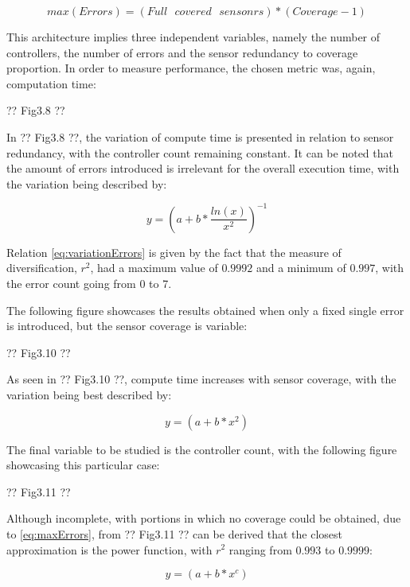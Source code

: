 \begin{equation}
    \label{eq:maxErrors}
    max(Errors) = (Full\text{ } covered \text{ } sensonrs) * (Coverage - 1) 
\end{equation}

This architecture implies three independent variables, namely the number of controllers, the number of errors and the sensor redundancy to
coverage proportion. In order to measure performance, the chosen metric was, again, computation time:

?? Fig3.8 ??

In ?? Fig3.8 ??, the variation of compute time is presented in relation to sensor redundancy, with the controller count remaining constant.
It can be noted that the amount of errors introduced is irrelevant for the overall execution time, with the variation being described by:

\begin{equation}
    \label{eq:variationErrors}
    y = \left(a + b * \frac{ln(x)}{x^2} \right)^{-1}
\end{equation}

Relation \cref{eq:variationErrors} is given by the fact that the measure of diversification, \(r^2\), had a maximum value of \(0.9992\) and a 
minimum of \(0.997\), with the error count going from 0 to 7. 

The following figure showcases the results obtained when only a fixed single error is introduced, but the sensor coverage is variable:

?? Fig3.10 ??

As seen in ?? Fig3.10 ??, compute time increases with sensor coverage, with the variation being best described by:

\begin{equation}
    \label{eq:variationCoverage}
    y = (a + b * x^2)
\end{equation}

The final variable to be studied is the controller count, with the following figure showcasing this particular case:

?? Fig3.11 ??

Although incomplete, with portions in which no coverage could be obtained, due to \cref{eq:maxErrors}, from ?? Fig3.11 ?? can be derived 
that the closest approximation is the power function, with \(r^2\) ranging from \(0.993\) to \(0.9999\):

\begin{equation}
    \label{eq:variationControllers}
    y = (a + b * x^c)
\end{equation}

